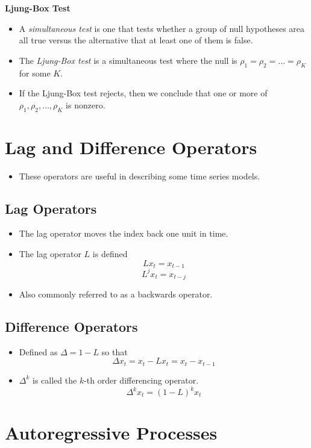 \documentclass[11pt]{article}
\begin{document}
\textbf{Ljung-Box Test}
\begin{itemize}
    \item A \textit{simultaneous test} is one that tests whether a group of null hypotheses area
    all true versus the alternative that at least one of them is false.
    \item The \textit{Ljung-Box test} is a simultaneous test where the null is $\rho_1 = \rho_2
    = \hdots =\rho_K$ for some $K$. 
    \item If the Ljung-Box test rejects, then we conclude that one or more of $\rho_1, \rho_2, 
    \ldots, \rho_K$ is nonzero. 
\end{itemize}

\section{Lag and Difference Operators}
\begin{itemize}
    \item These operators are useful in describing some time series models.
\end{itemize}
\subsection{Lag Operators}
\begin{itemize}
    \item The lag operator moves the index back one unit in time.
    \item The lag operator $L$ is defined 
    \[ L x_t = x_{t-1}\]
    \[ L^j x_t = x_{t-j}\]
    \item Also commonly referred to as a backwards operator. 
\end{itemize}

\subsection{Difference Operators}
\begin{itemize}
    \item Defined as $\Delta = 1 - L$ so that 
    \[\Delta x_t = x_t - L x_t = x_t - x_{t-1}\]
    \item $\Delta^k$ is called the $k$-th order differencing operator. 
    \[\Delta^k x_t = {(1-L)}^k x_t\]
\end{itemize}

\section{Autoregressive Processes}
\end{document}
